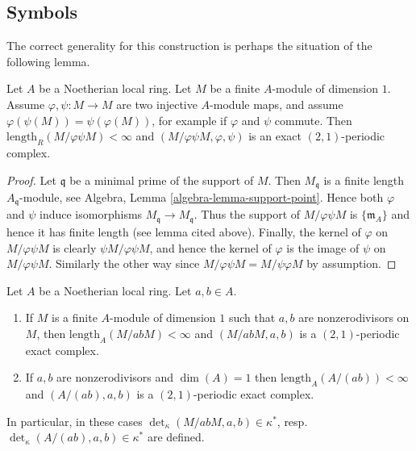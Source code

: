 \subsection{Symbols}
\label{subsection-symbols}

\noindent
The correct generality for this construction is perhaps the
situation of the following lemma.

\begin{lemma}
\label{lemma-pre-symbol}
Let $A$ be a Noetherian local ring.
Let $M$ be a finite $A$-module of dimension $1$.
Assume $\varphi, \psi : M \to M$ are two injective
$A$-module maps, and assume $\varphi(\psi(M)) = \psi(\varphi(M))$,
for example if $\varphi$ and $\psi$ commute.
Then $\text{length}_R(M/\varphi\psi M) < \infty$
and $(M/\varphi\psi M, \varphi, \psi)$ is an exact
$(2, 1)$-periodic complex.
\end{lemma}

\begin{proof}
Let $\mathfrak q$ be a minimal prime of the support of $M$.
Then $M_{\mathfrak q}$ is a finite length $A_{\mathfrak q}$-module,
see Algebra, Lemma \ref{algebra-lemma-support-point}.
Hence both $\varphi$ and $\psi$
induce isomorphisms $M_{\mathfrak q} \to M_{\mathfrak q}$.
Thus the support of $M/\varphi\psi M$ is $\{\mathfrak m_A\}$
and hence it has finite length (see lemma cited above).
Finally, the kernel of $\varphi$ on $M/\varphi\psi M$
is clearly $\psi M/\varphi\psi M$, and hence the kernel
of $\varphi$ is the image of $\psi$ on $M/\varphi\psi M$.
Similarly the other way since $M/\varphi\psi M = M/\psi\varphi M$
by assumption.
\end{proof}

\begin{lemma}
\label{lemma-symbol-defined}
Let $A$ be a Noetherian local ring. Let $a, b \in A$.
\begin{enumerate}
\item If $M$ is a finite $A$-module of dimension $1$
such that $a, b$ are nonzerodivisors on $M$, then
$\text{length}_A(M/abM) < \infty$ and
$(M/abM, a, b)$ is a $(2, 1)$-periodic exact complex.
\item If $a, b$ are nonzerodivisors and $\dim(A) = 1$
then $\text{length}_A(A/(ab)) < \infty$ and
$(A/(ab), a, b)$ is a $(2, 1)$-periodic exact complex.
\end{enumerate}
In particular, in these cases
$\det_\kappa(M/abM, a, b) \in \kappa^*$,
resp.\ $\det_\kappa(A/(ab), a, b) \in \kappa^*$
are defined.
\end{lemma}

